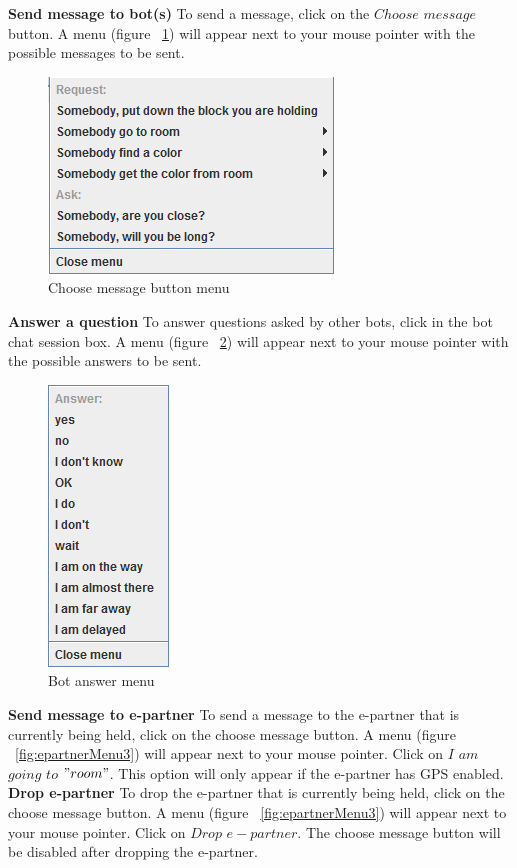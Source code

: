 \textbf{Send message to bot(s)}
To send a message, click on the $Choose$ $message$ button. A menu (figure ~\ref{fig:messageBot}) will appear next to your mouse pointer with the possible messages to be sent.
\\
\begin{figure}[h]
\begin{center}
\includegraphics{HumanPlayerGUI/hpg-bot-message.png}
\end{center}
\caption{Choose message button menu}
\label{fig:messageBot}
\end{figure}

\textbf{Answer a question}
To answer questions asked by other bots, click in the bot chat session box. A menu (figure ~\ref{fig:answerBot}) will appear next to your mouse pointer with the possible answers to be sent.
\\
\begin{figure}[h]
\begin{center}
\includegraphics{HumanPlayerGUI/hpg-bot-chat.png}
\end{center}
\caption{Bot answer menu}
\label{fig:answerBot}
\end{figure}

\textbf{Send message to e-partner}
To send a message to the e-partner that is currently being held, click on the choose message button. A menu (figure  ~\ref{fig:epartnerMenu3}) will appear next to your mouse pointer. Click on $I$ $am$ $going$ $to$ $"room"$. This option will only appear if the e-partner has GPS enabled.
\\
\textbf{Drop e-partner}
To drop the e-partner that is currently being held, click on the choose message button. A menu (figure  ~\ref{fig:epartnerMenu3}) will appear next to your mouse pointer. Click on $Drop$ $e-partner$. The choose message button will be disabled after dropping the e-partner.